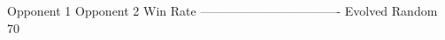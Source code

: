 \markdownRendererPipe{} Opponent 1 \markdownRendererPipe{} Opponent 2 \markdownRendererPipe{} Win Rate \markdownRendererPipe{} \markdownRendererPipe{}------------\markdownRendererPipe{}------------\markdownRendererPipe{}----------\markdownRendererPipe{} \markdownRendererPipe{} Evolved \markdownRendererPipe{} Random \markdownRendererPipe{} 70\markdownRendererPercentSign{} \markdownRendererPipe{}\relax